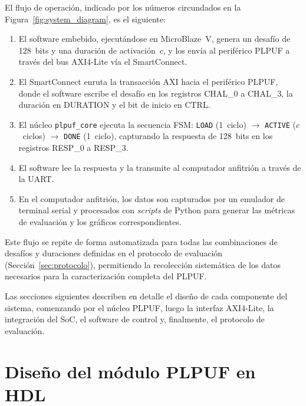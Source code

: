 El flujo de operación, indicado por los números circundados en la
Figura~\ref{fig:system_diagram}, es el siguiente:

\begin{enumerate}
  \item[\ding{1}] El software embebido, ejecutándose en MicroBlaze~V, genera un
    desafío de 128~bits y una duración de activación~$c$, y los envía al
    periférico PLPUF a través del bus AXI4-Lite vía el SmartConnect.

  \item[\ding{2}] El SmartConnect enruta la transacción AXI hacia el periférico
    PLPUF, donde el software escribe el desafío en los registros CHAL\_0 a
    CHAL\_3, la duración en DURATION y el bit de inicio en CTRL.

  \item[\ding{3}] El núcleo \texttt{plpuf\_core} ejecuta la secuencia FSM:
    \texttt{LOAD} (1~ciclo) $\rightarrow$ \texttt{ACTIVE} ($c$~ciclos)
    $\rightarrow$ \texttt{DONE} (1~ciclo), capturando la respuesta de
    128~bits en los registros RESP\_0 a RESP\_3.

  \item[\ding{4}] El software lee la respuesta y la transmite al computador
    anfitrión a través de la UART.

  \item[\ding{5}] En el computador anfitrión, los datos son capturados por un
    emulador de terminal serial y procesados con \textit{scripts} de Python
    para generar las métricas de evaluación y los gráficos correspondientes.
\end{enumerate}

Este flujo se repite de forma automatizada para todas las combinaciones de
desafíos y duraciones definidas en el protocolo de evaluación
(Sección~\ref{sec:protocolo}), permitiendo la recolección sistemática de los
datos necesarios para la caracterización completa del PLPUF.

Las secciones siguientes describen en detalle el diseño de cada componente
del sistema, comenzando por el núcleo PLPUF, luego la interfaz AXI4-Lite, la
integración del SoC, el software de control y, finalmente, el protocolo de
evaluación.

\section{Diseño del módulo PLPUF en HDL}
\label{sec:diseno_plpuf}

